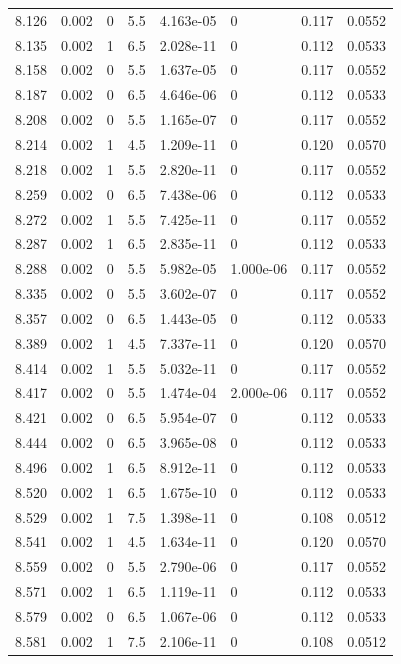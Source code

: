 \documentclass[preview]{standalone}
\begin{document}
{{{{{{{{{\begin{tabular}{L{1.2cm}C{1.2cm} C{0.3cm}C{0.5cm} C{1.4cm}C{1.4cm} C{1.4cm}C{1.4cm}}
  8.126  &  0.002  & 0     & 5.5 &  4.163e-05  & 0  & 0.117 &  0.0552   \\ 
  8.135  &  0.002  & 1     & 6.5 &  2.028e-11  & 0  & 0.112 &  0.0533   \\ 
  8.158  &  0.002  & 0     & 5.5 &  1.637e-05  & 0  & 0.117 &  0.0552   \\ 
  8.187  &  0.002  & 0     & 6.5 &  4.646e-06  & 0  & 0.112 &  0.0533   \\ 
  8.208  &  0.002  & 0     & 5.5 &  1.165e-07  & 0  & 0.117 &  0.0552   \\ 
  8.214  &  0.002  & 1     & 4.5 &  1.209e-11  & 0  & 0.120 &  0.0570   \\ 
  8.218  &  0.002  & 1     & 5.5 &  2.820e-11  & 0  & 0.117 &  0.0552   \\ 
  8.259  &  0.002  & 0     & 6.5 &  7.438e-06  & 0  & 0.112 &  0.0533   \\ 
  8.272  &  0.002  & 1     & 5.5 &  7.425e-11  & 0  & 0.117 &  0.0552   \\ 
  8.287  &  0.002  & 1     & 6.5 &  2.835e-11  & 0  & 0.112 &  0.0533   \\ 
  8.288  &  0.002  & 0     & 5.5 &  5.982e-05  & 1.000e-06  & 0.117 &  0.0552   \\ 
  8.335  &  0.002  & 0     & 5.5 &  3.602e-07  & 0  & 0.117 &  0.0552   \\ 
  8.357  &  0.002  & 0     & 6.5 &  1.443e-05  & 0  & 0.112 &  0.0533   \\ 
  8.389  &  0.002  & 1     & 4.5 &  7.337e-11  & 0  & 0.120 &  0.0570   \\ 
  8.414  &  0.002  & 1     & 5.5 &  5.032e-11  & 0  & 0.117 &  0.0552   \\ 
  8.417  &  0.002  & 0     & 5.5 &  1.474e-04  & 2.000e-06  & 0.117 &  0.0552   \\ 
  8.421  &  0.002  & 0     & 6.5 &  5.954e-07  & 0  & 0.112 &  0.0533   \\ 
  8.444  &  0.002  & 0     & 6.5 &  3.965e-08  & 0  & 0.112 &  0.0533   \\ 
  8.496  &  0.002  & 1     & 6.5 &  8.912e-11  & 0  & 0.112 &  0.0533   \\ 
  8.520  &  0.002  & 1     & 6.5 &  1.675e-10  & 0  & 0.112 &  0.0533   \\ 
  8.529  &  0.002  & 1     & 7.5 &  1.398e-11  & 0  & 0.108 &  0.0512   \\ 
  8.541  &  0.002  & 1     & 4.5 &  1.634e-11  & 0  & 0.120 &  0.0570   \\ 
  8.559  &  0.002  & 0     & 5.5 &  2.790e-06  & 0  & 0.117 &  0.0552   \\ 
  8.571  &  0.002  & 1     & 6.5 &  1.119e-11  & 0  & 0.112 &  0.0533   \\ 
  8.579  &  0.002  & 0     & 6.5 &  1.067e-06  & 0  & 0.112 &  0.0533   \\ 
  8.581  &  0.002  & 1     & 7.5 &  2.106e-11  & 0  & 0.108 &  0.0512   \\ 
\hline 
\end{tabular} 

}}}}}}}}}
\end{document}
